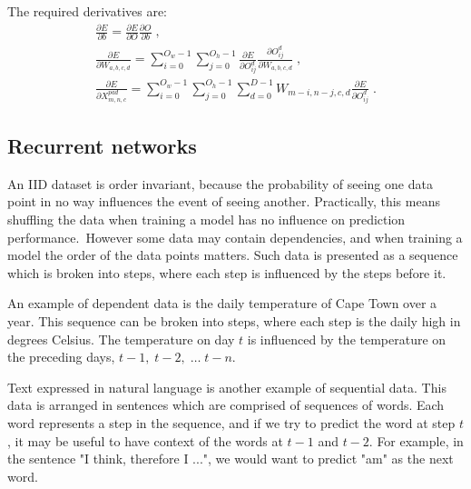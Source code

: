 \noindent The required derivatives are:
\begin{subequations}
	\begin{gather}
		\frac{\partial E} {\partial b} = \frac{\partial E} {\partial O}\frac{\partial O} {\partial b} \; , \\
		\frac{\partial E} {\partial W_{a,b,c,d}} = \sum_{i=0}^{O_w - 1}\sum_{j=0}^{O_h - 1}\frac{\partial E} {\partial O_{ij}^{d}}\frac{\partial O_{ij}^d} {\partial W_{a,b,c,d}} \; , \\
		\frac{\partial E} {\partial X_{m,n,c}^{pad}} = \sum_{i=0}^{O_w - 1}\sum_{j=0}^{O_h - 1}\sum_{d=0}^{D - 1}W_{m-i,n-j,c,d}\frac{\partial E} {\partial O_{ij}^{d}} \; .
	\end{gather}
\end{subequations}


\subsection{Recurrent networks}

An IID dataset is order invariant, because the probability of seeing one data point in no way influences the event of seeing another. Practically, this means shuffling the data when training a model has no influence on prediction performance.\ However some data may contain dependencies, and when training a model the order of the data points matters. Such data is presented as a sequence which is broken into steps, where each step is influenced by the steps before it. \par

\noindent An example of dependent data is the daily temperature of Cape Town over a year. This sequence can be broken into steps, where each step is the daily high in degrees Celsius. The temperature on day $ t $ is influenced by the temperature on the preceding days, $ t - 1, \; t - 2, \; \dots \; t - n $. \par
 
\noindent Text expressed in natural language is another example of sequential data. This data is arranged in sentences which are comprised of sequences of words. Each word represents a step in the sequence, and if we try to predict the word at step $ t $, it may be useful to have context of the words at $t -1$ and $t - 2$. For example, in the sentence "I think, therefore I ...", we would want to predict "am" as the next word. \par

